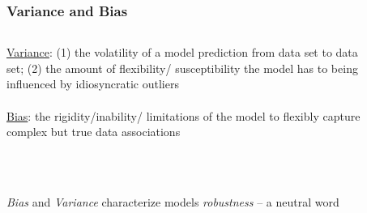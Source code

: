 \documentclass[xcolor={dvipsnames}]{beamer}
\begin{document}
\frame
{
\frametitle{Variance and Bias}

\begin{columns}
\begin{column}{.4\textwidth}

\underline{Variance}: (1) the volatility of a model prediction from data set to data set; (2) the amount of flexibility/ susceptibility
the model has to being influenced by idiosyncratic outliers \\${}$\\

\underline{Bias}: the rigidity/inability/ limitations of the model to flexibly capture complex but true data associations 

\end{column}
\begin{column}{.6\textwidth}
\begin{figure}
\vspace{-2em}
\end{figure}
\end{column}
\end{columns}


${}$\\${}$\\
\emph{Bias} and \emph{Variance} characterize models \emph{robustness} -- a neutral word

}
\end{document}
